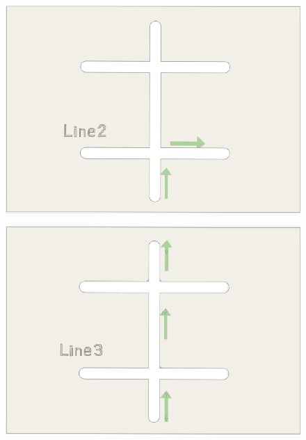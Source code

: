 \documentclass{beamer}
\begin{document}
\begin{frame}
    \begin{figure}[htpb]
        \centering
        \includegraphics[width=1\linewidth]{figure/line2.png}
    \end{figure}
\end{frame}

\begin{frame}
    \begin{figure}[htpb]
        \centering
        \includegraphics[width=1\linewidth]{figure/line3.png}
    \end{figure}
\end{frame}
\end{document}
